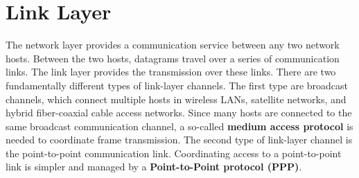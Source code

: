 \section{Link Layer}
The network layer provides a communication service between any two network hosts. Between the two hosts, datagrams travel over a series of communication links. The link layer provides the transmission over these links. There are two fundamentally different types of link-layer channels. The first type are broadcast channels, which connect multiple hosts in wireless LANs, satellite networks, and hybrid fiber-coaxial cable access networks. Since many hosts are connected to the same broadcast communication channel, a so-called \textbf{medium access protocol} is needed to coordinate frame transmission. The second type of link-layer channel is the point-to-point communication link. Coordinating access to a point-to-point link is simpler and managed by a \textbf{Point-to-Point protocol (PPP)}.\vspace{.3cm}\\


